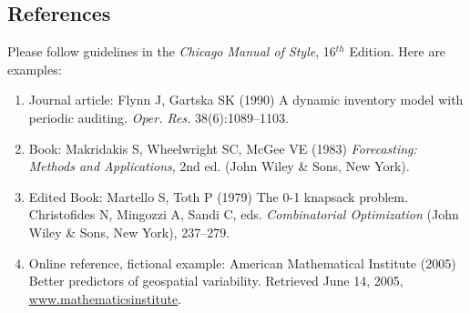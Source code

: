 \documentclass[11pt]{article} %
\begin{document}
\subsection*{References}

Please follow guidelines in the \textit{Chicago Manual of Style}, 16$^{th}$ Edition. Here are examples: 

\begin{enumerate}

\item Journal article: Flynn J, Gartska SK (1990) A dynamic inventory model with periodic auditing. \textit{Oper. Res.} 38(6):1089--1103. 

\item Book: Makridakis S, Wheelwright SC, McGee VE (1983) \textit{Forecasting: Methods and Applications}, 2nd ed. (John Wiley {\&} Sons, New York). 

\item Edited Book: Martello S, Toth P (1979) The 0-1 knapsack problem. Christofides N, Mingozzi A, Sandi C, eds. \textit{Combinatorial Optimization} (John Wiley {\&} Sons, New York), 237--279.

\item Online reference, fictional example: American Mathematical Institute (2005) Better predictors of geospatial variability. Retrieved June 14, 2005, \underline {www.mathematicsinstitute}.

\end{enumerate}

\endgroup
\end{document}
